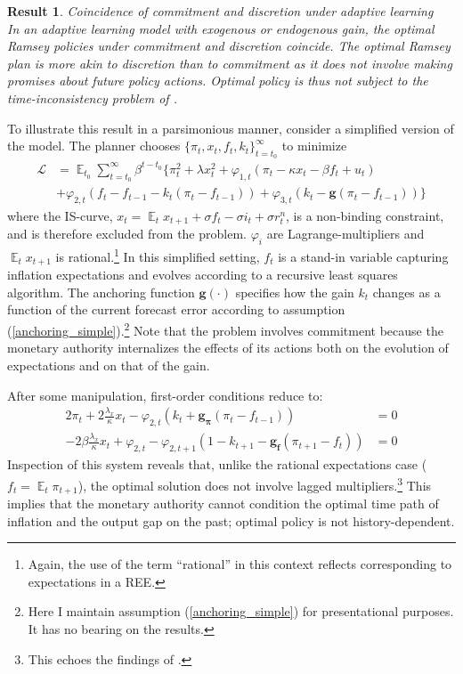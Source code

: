 \documentclass[11pt]{article}
\renewcommand{\[}{\begin{equation}}
\renewcommand{\]}{\end{equation}}
\newtheorem{result}{Result}
\DeclareMathOperator{\E}{\mathbb{E}}
\begin{document}
\begin{result} Coincidence of commitment and discretion under adaptive learning \\
In an adaptive learning model with exogenous or endogenous gain, the optimal Ramsey policies under commitment and discretion coincide. The optimal Ramsey plan is more akin to discretion than to commitment as it does not involve making promises about future policy actions. Optimal policy is thus not subject to the time-inconsistency problem of \cite{kydland1977rules}.
\label{result_no_commitment}
\end{result}

To illustrate this result in a parsimonious manner, consider a simplified version of the model. The planner chooses $\{\pi_t, x_t, f_t, k_t\}_{t=t_0}^{\infty}$ to minimize
 \begin{align*}
\mathcal{L} &= \E_{t_0}\sum_{t=t_0}^{\infty} \beta^{t-t_0}\bigg\{ \pi_t^2  + \lambda x_t^2 + \varphi_{1,t} (\pi_t -\kappa x_t- \beta f_t +u_t) \\ &+ \varphi_{2,t}(f_t - f_{t-1} -k_t(\pi_t - f_{t-1})) + \varphi_{3,t}(k_t - \mathbf{g}(\pi_t - f_{t-1})) \bigg\}
 \end{align*}
 where the IS-curve, $x_t = \E_t x_{t+1}+\sigma f_t -\sigma i_t +\sigma r_t^n$, is a non-binding constraint, and is therefore excluded from the problem. $\varphi_i$ are Lagrange-multipliers and $\E_t x_{t+1}$ is rational.\footnote{Again, the use of the term ``rational'' in this context reflects corresponding to expectations in a REE.} In this simplified setting, $f_t$ is a stand-in variable capturing inflation expectations and evolves according to a recursive least squares algorithm. The anchoring function $\mathbf{g}(\cdot)$ specifies how the gain $k_t$ changes as a function of the current forecast error according to assumption (\ref{anchoring_simple}).\footnote{Here I maintain assumption (\ref{anchoring_simple}) for presentational purposes. It has no bearing on the results.} Note that the problem involves commitment because the monetary authority internalizes the effects of its actions both on the evolution of expectations and on that of the gain. 
 
 After some manipulation, first-order conditions reduce to:
 \begin{align}
  2\pi_t +2\frac{\lambda_x}{\kappa}x_t -\varphi_{2,t}(k_t + \mathbf{g_{\pi}}(\pi_t -f_{t-1}))& = 0 \label{simpleFOC1} \\
  -2\beta\frac{\lambda_x}{\kappa}x_t + \varphi_{2,t} -\varphi_{2,t+1}(1-k_{t+1} -\mathbf{g_{f}}(\pi_{t+1} -f_{t})) & = 0 \label{simpleFOC2} 
 \end{align}
Inspection of this system reveals that, unlike the rational expectations case ($f_t = \E_t{\pi_{t+1}}$), the optimal solution does not involve lagged multipliers.\footnote{This echoes the findings of \cite{molnar2014optimal}.} This implies that the monetary authority cannot condition the optimal time path of inflation and the output gap on the past; optimal policy is not history-dependent. 
\end{document}
